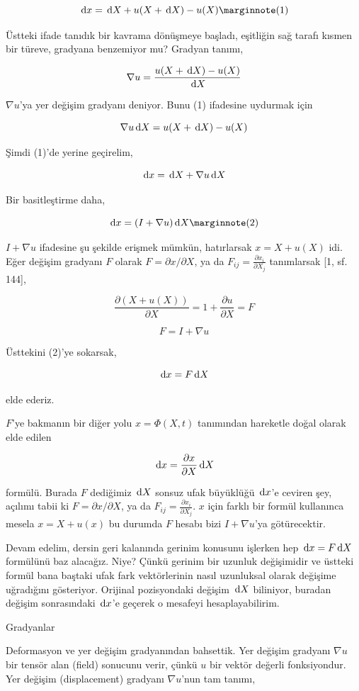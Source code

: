 \documentclass[12pt,fleqn]{article}\usepackage{../../common}
\begin{document}
$$
\ud x = \ud X + u(X+\ud X) - u(X)
\mlabel{1}
$$

Üstteki ifade tanıdık bir kavrama dönüşmeye başladı, eşitliğin sağ tarafı kısmen
bir türeve, gradyana benzemiyor mu? Gradyan tanımı,

$$
\nabla u = \frac{u(X+\,\mathrm{d} X) - u(X)}{\,\mathrm{d} X}
$$

$\nabla u$'ya yer değişim gradyanı deniyor.  Bunu (1) ifadesine uydurmak için 

$$
\nabla u \,\mathrm{d} X = u(X+\,\mathrm{d} X) - u(X)
$$


Şimdi (1)'de yerine geçirelim,

$$
\,\mathrm{d} x = \,\mathrm{d} X + \nabla u \,\mathrm{d} X
$$

Bir basitleştirme daha,

$$
\ud x = (I + \nabla u) \ud X
\mlabel{2}
$$

$I + \nabla u$ ifadesine şu şekilde erişmek mümkün, hatırlarsak
$x = X + u(X)$ idi. Eğer değişim gradyanı $F$ olarak $F = \partial x / \partial X$,
ya da $F_{ij} = \frac{\partial x_i}{\partial X_j}$ tanımlarsak [1, sf. 144], 

$$
\frac{\partial (X + u(X))}{\partial X} = 1  + \frac{\partial u}{\partial X} = F
$$

$$
F = I + \nabla u
$$

Üsttekini (2)'ye sokarsak,

$$
\,\mathrm{d} x = F \,\mathrm{d} X
$$

elde ederiz.

$F$'ye bakmanın bir diğer yolu $x = \Phi(X,t)$ tanımından hareketle doğal olarak
elde edilen

$$
\,\mathrm{d} x = \frac{\partial x}{\partial X} \,\mathrm{d} X
$$

formülü. Burada $F$ dediğimiz $\,\mathrm{d} X$ sonsuz ufak büyüklüğü $\,\mathrm{d} x$'e ceviren
şey, açılımı tabii ki $F = \partial x / \partial X$, ya da $F_{ij} = \frac{\partial x_i}{\partial X_j}$.
$x$ için farklı bir formül kullanınca mesela $x = X + u(x)$ bu durumda $F$
hesabı bizi $I + \nabla u$'ya götürecektir.

Devam edelim, dersin geri kalanında gerinim konusunu işlerken hep $\,\mathrm{d} x = F \,\mathrm{d}
X$ formülünü baz alacağız. Niye?  Çünkü gerinim bir uzunluk değişimidir ve
üstteki formül bana baştaki ufak fark vektörlerinin nasıl uzunluksal olarak
değişime uğradığını gösteriyor. Orijinal pozisyondaki değişim $\,\mathrm{d} X$ biliniyor,
buradan değişim sonrasındaki $\,\mathrm{d} x$'e geçerek o mesafeyi hesaplayabilirim.


Gradyanlar

Deformasyon ve yer değişim gradyanından bahsettik. Yer değişim gradyanı $\nabla
u$ bir tensör alan (field) sonucunu verir, çünkü $u$ bir vektör değerli
fonksiyondur. Yer değişim (displacement) gradyanı $\nabla u$'nun tam tanımı,
\end{document}
